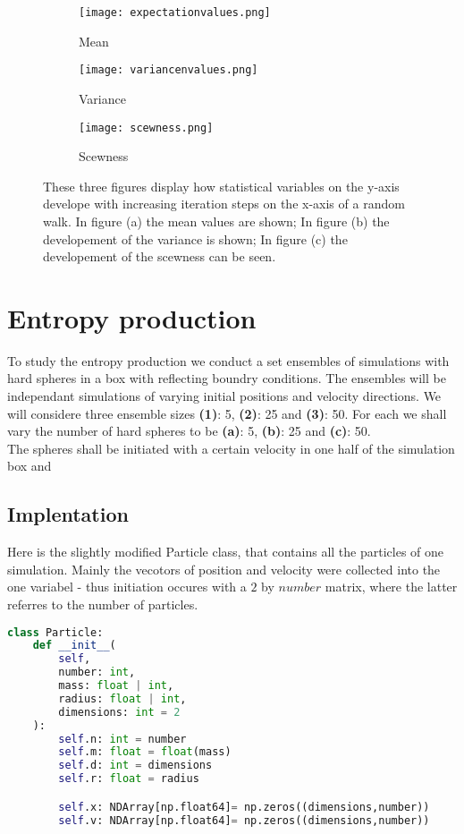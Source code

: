 \documentclass{article}[a4paper]
\begin{document}
\begin{figure}[h!]
    \centering
    \begin{subfigure}{0.4\textwidth}
       \texttt{[image: expectationvalues.png]} 
       \caption{Mean}
       \label{fig:mean}
    \end{subfigure}
    \hfill 
    \begin{subfigure}{0.4\textwidth}
        \texttt{[image: variancenvalues.png]}
        \caption{Variance}
        \label{fig:var}
    \end{subfigure} 
    \hfill 
    \begin{subfigure}{0.4\textwidth}
        \texttt{[image: scewness.png]}
        \caption{Scewness}
        \label{fig:skew}
    \end{subfigure}
    \caption{These three figures display how statistical variables on the y-axis develope with increasing iteration steps on the x-axis of a random walk. In figure (a) the mean values are shown; In figure (b) the developement of the variance is shown; In figure (c) the developement of the scewness can be seen.}
    \label{fig:statistics_of_RW}
\end{figure}
\pagebreak

\section{Entropy production}
To study the entropy production we conduct a set ensembles of simulations with hard spheres in a box with reflecting boundry conditions. The ensembles will be independant simulations of varying initial positions and velocity directions. We will considere three ensemble sizes \textbf{(1)}: 5, \textbf{(2)}: 25 and \textbf{(3)}: 50. For each we shall vary the number of hard spheres to be \textbf{(a)}: 5, \textbf{(b)}: 25 and \textbf{(c)}: 50. \\
The spheres shall be initiated with a certain velocity in one half of the simulation box and 


\subsection{Implentation}

Here is the slightly modified Particle class, that contains all the particles of one simulation. Mainly the vecotors of position and velocity were collected into the one variabel - thus initiation occures with a $2$ by $number$ matrix, where the latter referres to the number of particles.
\begin{lstlisting}[language=python]
class Particle:
    def __init__(
        self,
        number: int,
        mass: float | int,
        radius: float | int,
        dimensions: int = 2
    ):
        self.n: int = number
        self.m: float = float(mass)
        self.d: int = dimensions
        self.r: float = radius

        self.x: NDArray[np.float64]= np.zeros((dimensions,number))
        self.v: NDArray[np.float64]= np.zeros((dimensions,number))
\end{lstlisting}
\end{document}
